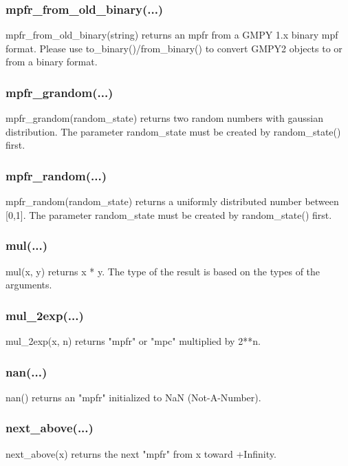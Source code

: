 \subsubsection{mpfr\_from\_old\_binary(...)}

mpfr\_from\_old\_binary(string) returns an mpfr from a GMPY 1.x binary mpf format. Please use
to\_binary()/from\_binary() to convert GMPY2 objects to or from a binary format.

\subsubsection{mpfr\_grandom(...)}

mpfr\_grandom(random\_state) returns two random numbers with gaussian distribution. The
parameter random\_state must be created by random\_state() first.

\subsubsection{mpfr\_random(...)}

mpfr\_random(random\_state) returns a uniformly distributed number between [0,1]. The
parameter random\_state must be created by random\_state() first.

\subsubsection{mul(...)}

mul(x, y) returns x * y. The type of the result is based on the types of the arguments.

\subsubsection{mul\_2exp(...)}

mul\_2exp(x, n) returns "mpfr" or "mpc" multiplied by 2**n.

\subsubsection{nan(...)}

nan() returns an "mpfr" initialized to NaN (Not-A-Number).

\subsubsection{next\_above(...)}

next\_above(x) returns the next "mpfr" from x toward +Infinity.

